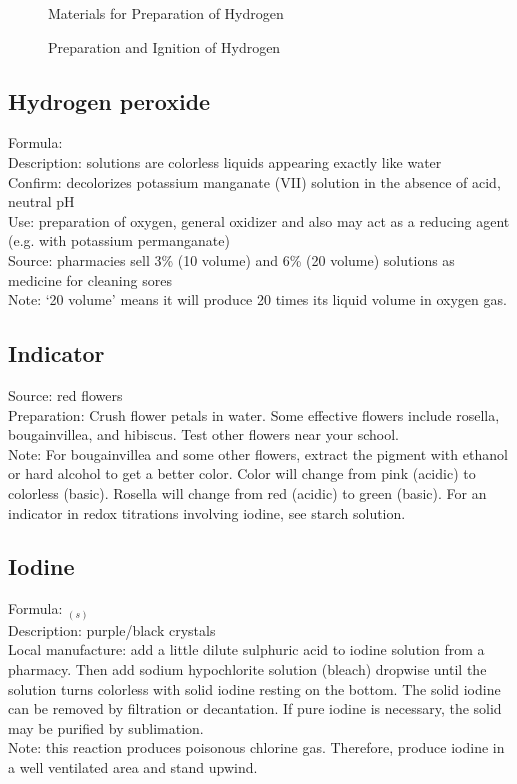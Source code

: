 \begin{figure}[h]
\begin{center}
\def\svgwidth{250pt}

\caption{Materials for Preparation of Hydrogen}
\end{center}
\end{figure}

\begin{figure}[h]
\begin{center}
\def\svgwidth{300pt}

\caption{Preparation and Ignition of Hydrogen}
\end{center}
\end{figure}

\subsection*{Hydrogen peroxide}
Formula: \\
Description: solutions are colorless liquids 
appearing exactly like water\\
Confirm: decolorizes potassium manganate (VII) solution 
in the absence of acid, 
neutral pH\\
Use: preparation of oxygen, 
general oxidizer and also may act as a reducing agent (e.g. 
with potassium permanganate)\\
Source: pharmacies sell 3\% (10 volume) and 6\% (20 volume) solutions 
as medicine for cleaning sores\\
Note: `20 volume' means it will produce 20 times its liquid volume in oxygen gas.
\subsection*{Indicator}
\label{sec:indicator}
Source: red flowers\\
Preparation: Crush flower petals in water. 
Some effective flowers include rosella, 
bougainvillea, 
and hibiscus. 
Test other flowers near your school.\\
Note: For bougainvillea and some other flowers, 
extract the pigment with ethanol 
or hard alcohol to get a better color. 
Color will change from pink (acidic) to colorless (basic). 
Rosella will change from red (acidic) to green (basic).
For an indicator in redox titrations involving iodine, 
see starch solution.
\subsection*{Iodine}
Formula: $_{(s)}$\\
Description: purple/black crystals\\
Local manufacture: add a little dilute sulphuric acid 
to iodine solution from a pharmacy. 
Then add sodium hypochlorite solution (bleach) dropwise 
until the solution turns colorless with solid iodine resting on the bottom. 
The solid iodine can be removed by filtration or decantation. 
If pure iodine is necessary, 
the solid may be purified by sublimation.\\
Note: this reaction produces poisonous chlorine gas. 
Therefore, 
produce iodine in a well ventilated area and stand upwind.
